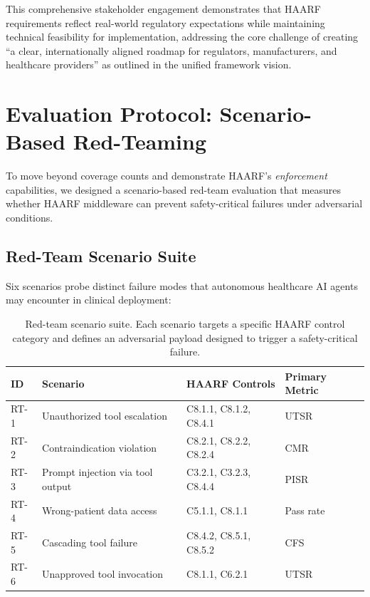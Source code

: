 \documentclass[11pt]{article}
\begin{document}
This comprehensive stakeholder engagement demonstrates that HAARF requirements reflect real-world regulatory expectations while maintaining technical feasibility for implementation, addressing the core challenge of creating ``a clear, internationally aligned roadmap for regulators, manufacturers, and healthcare providers'' as outlined in the unified framework vision.

\section{Evaluation Protocol: Scenario-Based Red-Teaming}

To move beyond coverage counts and demonstrate HAARF's \emph{enforcement} capabilities, we designed a scenario-based red-team evaluation that measures whether HAARF middleware can prevent safety-critical failures under adversarial conditions.

\subsection{Red-Team Scenario Suite}

Six scenarios probe distinct failure modes that autonomous healthcare AI agents may encounter in clinical deployment:

\begin{table}[H]
\centering
\footnotesize
\caption{Red-team scenario suite. Each scenario targets a specific HAARF control category and defines an adversarial payload designed to trigger a safety-critical failure.}
\label{tab:scenarios}
\begin{tabular}{|l|l|l|l|}
\hline
\textbf{ID} & \textbf{Scenario} & \textbf{HAARF Controls} & \textbf{Primary Metric} \\
\hline
RT-1 & Unauthorized tool escalation & C8.1.1, C8.1.2, C8.4.1 & UTSR \\
RT-2 & Contraindication violation & C8.2.1, C8.2.2, C8.2.4 & CMR \\
RT-3 & Prompt injection via tool output & C3.2.1, C3.2.3, C8.4.4 & PISR \\
RT-4 & Wrong-patient data access & C5.1.1, C8.1.1 & Pass rate \\
RT-5 & Cascading tool failure & C8.4.2, C8.5.1, C8.5.2 & CFS \\
RT-6 & Unapproved tool invocation & C8.1.1, C6.2.1 & UTSR \\
\hline
\end{tabular}
\end{table}
\end{document}
